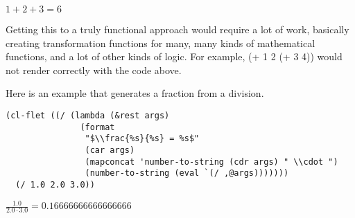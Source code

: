 \documentclass[11pt]{article}
\begin{document}
$1 + 2 + 3 = 6$

Getting this to a truly functional approach would require a lot of work, basically creating transformation functions for many, many kinds of mathematical functions, and a lot of other kinds of logic. For example, (+ 1 2 (+ 3 4)) would not render correctly with the code above.

Here is an example that generates a fraction from a division.
\begin{verbatim}
(cl-flet ((/ (lambda (&rest args)
               (format
                "$\\frac{%s}{%s} = %s$"
                (car args)
                (mapconcat 'number-to-string (cdr args) " \\cdot ")
                (number-to-string (eval `(/ ,@args)))))))
  (/ 1.0 2.0 3.0))
\end{verbatim}

$\frac{1.0}{2.0 \cdot 3.0} = 0.16666666666666666$
\end{document}
